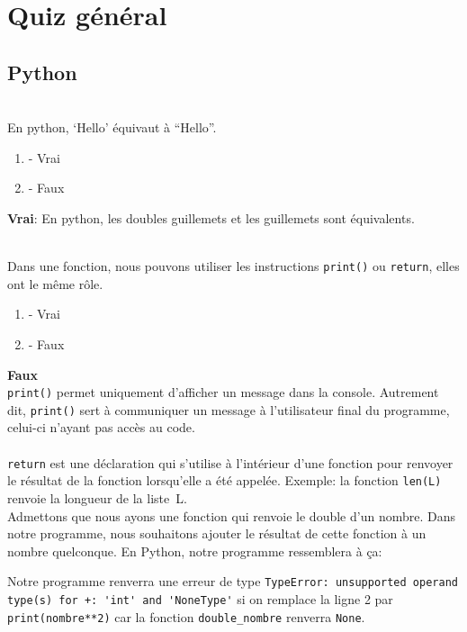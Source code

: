 \section{Quiz général}

\subsection{Python}

\begin{Exercice}[2 minutes]\\
En python, `Hello' équivaut à ``Hello''. 

\begin{enumerate}[label=\Alph*]
    \item - Vrai
    \item - Faux
\end{enumerate}
\begin{solution}
    \textbf{Vrai}: En python, les doubles guillemets et les guillemets sont équivalents. 
\end{solution}
\end{Exercice}


\begin{Exercice}[2 minutes]\\
Dans une fonction, nous pouvons utiliser les instructions \lstinline{print()} ou \lstinline{return}, elles ont le même rôle.
\begin{enumerate}[label=\Alph*]
    \item - Vrai
    \item - Faux
\end{enumerate}
\begin{solution}
    \textbf{Faux}\\
    \lstinline{print()} permet uniquement d'afficher un message dans la console. Autrement dit, \lstinline{print()} sert à communiquer un message à l'utilisateur final du programme, celui-ci n'ayant pas accès au code.\\\\
    \lstinline{return} est une déclaration qui s'utilise à l'intérieur d'une fonction pour renvoyer le résultat de la fonction lorsqu'elle a été appelée. Exemple: la fonction \lstinline{len(L)} renvoie la longueur de la liste~L.\\

    Admettons que nous ayons une fonction qui renvoie le double d'un nombre. Dans notre programme, nous souhaitons ajouter le résultat de cette fonction à un nombre quelconque.
    En Python, notre programme ressemblera à ça:
    

    Notre programme renverra une erreur de type \lstinline{TypeError: unsupported operand type(s) for +: 'int' and 'NoneType'} si on remplace la ligne 2 par \lstinline{print(nombre**2)} car la fonction \lstinline{double_nombre} renverra \lstinline{None}.
\end{solution}
\end{Exercice}


